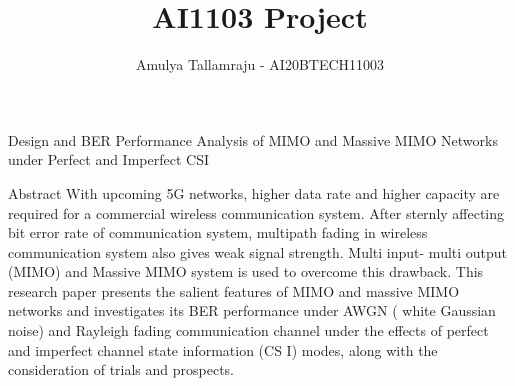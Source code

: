 \documentclass{beamer}
\title{AI1103 Project}
\author{Amulya Tallamraju - AI20BTECH11003}
\date{}
\begin{document}
\begin{frame}
\titlepage
\end{frame}
\section{}
\begin{frame}{Design and BER Performance  Analysis of MIMO and Massive MIMO Networks under Perfect and Imperfect CSI }
\begin{block}{Abstract}
With  upcoming  5G networks, higher data rate and higher    capacity    are   required   for   a   commercial wireless communication  system.
After sternly affecting  bit  error  rate  of  communication  system,  multipath fading  in  wireless communication system also gives weak signal strength. 
Multi input- multi output (MIMO) and Massive MIMO  system is used to overcome this drawback. This  research  paper  presents  the  salient features of MIMO  and massive MIMO  networks and  investigates its  BER  performance  under  AWGN  (  white Gaussian noise) and Rayleigh  fading  communication  channel  under  the  effects  of perfect  and  imperfect  channel  state  information  (CS I)  modes, along with the consideration of trials and prospects.
\end{block}
\end{frame}
\end{document}
